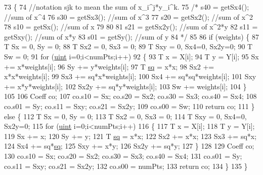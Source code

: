 \begin{DoxyCode}
73     \{
74         \textcolor{comment}{//notation sjk to mean the sum of x\_i^j*y\_i^k. }
75     \textcolor{comment}{/*    s40 = getSx4(); //sum of x^4}
76 \textcolor{comment}{        s30 = getSx3(); //sum of x^3}
77 \textcolor{comment}{        s20 = getSx2(); //sum of x^2}
78 \textcolor{comment}{        s10 = getSx();  //sum of x}
79 \textcolor{comment}{        }
80 \textcolor{comment}{}
81 \textcolor{comment}{        s21 = getSx2y(); //sum of x^2*y}
82 \textcolor{comment}{        s11 = getSxy();  //sum of x*y}
83 \textcolor{comment}{        s01 = getSy();   //sum of y}
84 \textcolor{comment}{        */}
85 
86         \textcolor{keywordflow}{if} (weights) \{
87             T Sx = 0, Sy = 0;
88             T Sx2 = 0, Sx3 = 0;
89             T Sxy = 0, Sx4=0, Sx2y=0;
90             T Sw = 0;
91             \textcolor{keywordflow}{for} (\hyperlink{std__incl_8h_a91ad9478d81a7aaf2593e8d9c3d06a14}{uint} i=0;i<numPts;i++)
92             \{
93                 T x = X[i];
94                 T y = Y[i];
95                 Sx += x*weights[i];
96                 Sy += y*weights[i];
97                 T \hyperlink{utils_8cpp_a5d9a285a9ed595c633d5fc06e622df8f}{sq} = x*x;
98                 Sx2 += x*x*weights[i];
99                 Sx3 += sq*x*weights[i];
100                 Sx4 += sq*sq*weights[i];
101                 Sxy += x*y*weights[i];
102                 Sx2y += sq*y*weights[i];
103                 Sw += weights[i];
104             \}
105 
106             Coeff co;
107             co.s10 = Sx; co.s20 = Sx2; co.s30 = Sx3; co.s40 = Sx4;
108             co.s01 = Sy; co.s11 = Sxy; co.s21 = Sx2y;
109             co.s00 = Sw;
110             \textcolor{keywordflow}{return} co;
111         \} \textcolor{keywordflow}{else} \{
112             T Sx = 0, Sy = 0;
113             T Sx2 = 0, Sx3 = 0;
114             T Sxy = 0, Sx4=0, Sx2y=0;
115             \textcolor{keywordflow}{for} (\hyperlink{std__incl_8h_a91ad9478d81a7aaf2593e8d9c3d06a14}{uint} i=0;i<numPts;i++)
116             \{
117                 T x = X[i];
118                 T y = Y[i];
119                 Sx += x;
120                 Sy += y;
121                 T \hyperlink{utils_8cpp_a5d9a285a9ed595c633d5fc06e622df8f}{sq} = x*x;
122                 Sx2 += x*x;
123                 Sx3 += sq*x;
124                 Sx4 += sq*\hyperlink{utils_8cpp_a5d9a285a9ed595c633d5fc06e622df8f}{sq};
125                 Sxy += x*y;
126                 Sx2y += sq*y;
127             \}
128 
129             Coeff co;
130             co.s10 = Sx; co.s20 = Sx2; co.s30 = Sx3; co.s40 = Sx4;
131             co.s01 = Sy; co.s11 = Sxy; co.s21 = Sx2y;
132             co.s00 = numPts;
133             \textcolor{keywordflow}{return} co;
134         \}
135     \}
\end{DoxyCode}
